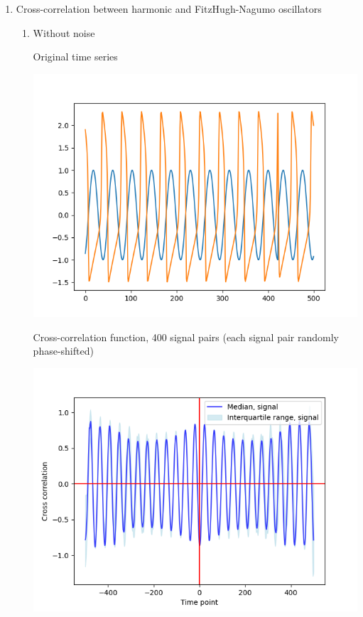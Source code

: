 


\begin{enumerate}
\item Cross-correlation between harmonic and FitzHugh-Nagumo oscillators
\label{sec:orgd5cc0d1}

\begin{enumerate}
\item Without noise
\label{sec:org2f425b6}

Original time series
\begin{center}
\includegraphics[width=.9\linewidth]{sinusoid_and_fitzhughnagumo_nonoise.png}
\end{center}

Cross-correlation function, 400 signal pairs (each signal pair randomly phase-shifted)
\begin{center}
\includegraphics[width=.9\linewidth]{randomshift_sinusoid_fitzhughnagumo_xcf.png}
\end{center}


\end{enumerate}
\end{enumerate}
